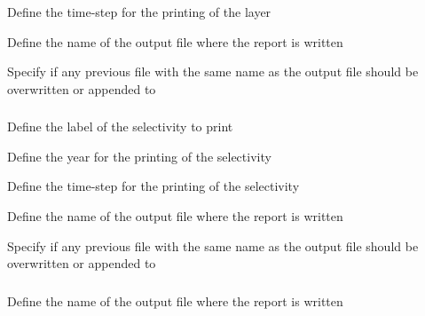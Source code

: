  {Define the time-step for the printing of the layer}

 {Define the name of the output file where the report is written}

 {Specify if any previous file with the same name as the output file should be overwritten or appended to}

\subsubsection[Print a selectivity]{}

 {Define the label of the selectivity to print}

 {Define the year for the printing of the selectivity}

 {Define the time-step for the printing of the selectivity}

 {Define the name of the output file where the report is written}

 {Specify if any previous file with the same name as the output file should be overwritten or appended to}

\subsubsection[Print the random number seed used]{}

 {Define the name of the output file where the report is written}

